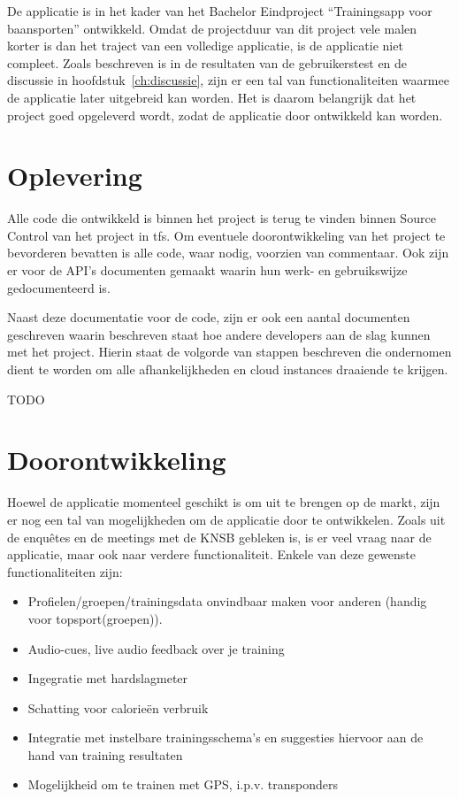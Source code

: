 De applicatie is in het kader van het Bachelor Eindproject ``Trainingsapp voor baansporten'' ontwikkeld. Omdat de projectduur van dit project vele malen korter is dan het traject van een volledige applicatie, is de applicatie niet compleet. Zoals beschreven is in de resultaten van de gebruikerstest en de discussie in hoofdstuk~\ref{ch:discussie}, zijn er een tal van functionaliteiten waarmee de applicatie later uitgebreid kan worden. Het is daarom belangrijk dat het project goed opgeleverd wordt, zodat de applicatie door ontwikkeld kan worden.

\section{Oplevering}
Alle code die ontwikkeld is binnen het project is terug te vinden binnen Source Control van het project in \ac{tfs}.
Om eventuele doorontwikkeling van het project te bevorderen bevatten is alle code, waar nodig, voorzien van commentaar. Ook zijn er voor de API's documenten gemaakt waarin hun werk- en gebruikswijze gedocumenteerd is. 

Naast deze documentatie voor de code, zijn er ook een aantal documenten geschreven waarin beschreven staat hoe andere developers aan de slag kunnen met het project. Hierin staat de volgorde van stappen beschreven die ondernomen dient te worden om alle afhankelijkheden en cloud instances draaiende te krijgen.

{\par \bigskip \par \color{red} TODO \par \bigskip \par }

\section{Doorontwikkeling}
Hoewel de applicatie momenteel geschikt is om uit te brengen op de markt, zijn er nog een tal van mogelijkheden om de applicatie door te ontwikkelen. Zoals uit de enquêtes en de meetings met de \ac{KNSB} gebleken is, is er veel vraag naar de applicatie, maar ook naar verdere functionaliteit. 
Enkele van deze gewenste functionaliteiten zijn:

\begin{itemize}
\item Profielen/groepen/trainingsdata onvindbaar maken voor anderen (handig voor topsport(groepen)).
\item Audio-cues, live audio feedback over je training 
\item Ingegratie met hardslagmeter
\item Schatting voor calorieën verbruik
\item Integratie met instelbare trainingsschema's en suggesties hiervoor aan de hand van training resultaten
\item Mogelijkheid om te trainen met GPS, i.p.v. transponders
\end{itemize}

